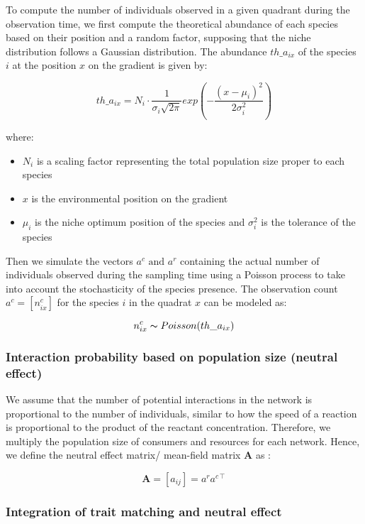 To compute the number of individuals observed in a given quadrant during the observation time, we first compute the theoretical abundance of each species based on their position and a random factor, supposing that the niche distribution follows a Gaussian distribution.
The abundance $th\_a_{ix}$ of the species $i$ at the position $x$ on the gradient is given by:

$$
    th\_a_{ix} = N_i \cdot \frac{1}{\sigma_i\sqrt{2\pi}} exp \left( -\frac{(x-\mu_i)^2}{2\sigma_i^2} \right)
$$

where:
\begin{itemize}
    \item $N_i$ is a scaling factor representing the total population size proper to each species
    \item $x$ is the environmental position on the gradient
    \item $\mu_i$ is the niche optimum position of the species and $\sigma_i^2$ is the tolerance of the species
\end{itemize}

Then we simulate the vectors $a^c \text{ and } a^r$ containing the actual number of individuals observed during the sampling time using a Poisson process to take into account the stochasticity of the species presence. The observation count $a^c = [n_{ix}^c]$ for the species $i$ in the quadrat $x$ can be modeled as:

$$
    n_{ix}^c \thicksim Poisson(th\_a_{ix})
$$

\subsubsection{Interaction probability based on population size (neutral effect)}

We assume that the number of potential interactions in the network is proportional to the number of individuals, similar to how the speed of a reaction is proportional to the product of the reactant concentration. Therefore, we multiply the population size of consumers and resources for each network. 
Hence, we define the neutral effect matrix/ mean-field matrix $\mathbf{A}$ as : 

$$
    \mathbf{A} = [a_{ij}] = a^r a^{c\intercal}
$$

\subsubsection{Integration of trait matching and neutral effect}

